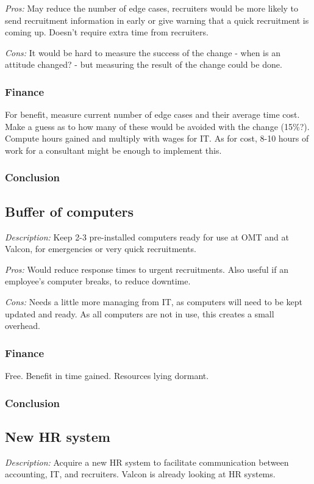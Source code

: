\emph{Pros:} May reduce the number of edge cases, recruiters would be more likely to send recruitment information in early or give warning that a quick recruitment is coming up.
Doesn't require extra time from recruiters.

\emph{Cons:} It would be hard to measure the success of the change - when is an attitude changed? - but measuring the result of the change could be done.

\subsubsection{Finance} For benefit, measure current number of edge cases and their average time cost.
Make a guess as to how many of these would be avoided with the change (15\%?).
Compute hours gained and multiply with wages for IT.
As for cost, 8-10 hours of work for a consultant might be enough to implement this.

\subsubsection{Conclusion} 

\subsection{Buffer of computers}
\emph{Description:} Keep 2-3 pre-installed computers ready for use at OMT and at Valcon, for emergencies or very quick recruitments.

\emph{Pros:} Would reduce response times to urgent recruitments.
Also useful if an employee's computer breaks, to reduce downtime.

\emph{Cons:} Needs a little more managing from IT, as
computers will need to be kept updated and ready.
As all computers are not in use, this creates a small overhead.

\subsubsection{Finance} Free. Benefit in time gained. Resources lying dormant.

\subsubsection{Conclusion}

\subsection{New HR system}
\emph{Description:} Acquire a new HR system to facilitate communication between accounting, IT, and recruiters.
Valcon is already looking at HR systems.

